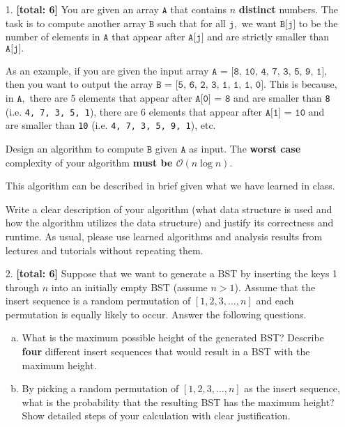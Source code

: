 \documentclass{assignment-263}
\newcommand{\bigOh}{\mathcal{O}}
\begin{document}
\think

  \begin{enumerate}

%  
\item[1.] \textbf{[total: 6]}
  You are given an array $\texttt{A}$ that contains $n$ \textbf{distinct}
  numbers. The task is to compute another array $\texttt{B}$ such that for all
  $\texttt{j},$ we want $\texttt{B[j]}$ to be the number of elements in
  $\texttt{A}$ that appear after $\texttt{A[j]}$ and are strictly
  smaller than $\texttt{A[j]}.$

  As an example, if you are given the input array
  $\texttt{A = [8, 10, 4, 7, 3, 5, 9, 1]},$ then you want to output
  the array $\texttt{B = [5, 6, 2, 3, 1, 1, 1, 0]}.$ This is because,
  in $\texttt{A},$ there are 5 elements that appear after
  $\texttt{A[0] = 8}$ and are smaller than \texttt{8} (i.e. \texttt{4,
    7, 3, 5, 1}), there are 6 elements that appear after
  $\texttt{A[1] = 10}$ and are smaller than \texttt{10}
  (i.e. \texttt{4, 7, 3, 5, 9, 1}), etc.
  

  Design an algorithm to compute $\texttt{B}$ given $\texttt{A}$ as
  input. The \textbf{worst case} complexity of your algorithm
  \textbf{must be $\bigOh(n\log n)$}.

  This algorithm can be described in brief given what we have learned
  in class. 
  
  Write a clear description of your algorithm (what data structure is
  used and how the algorithm utilizes the data structure) and justify
  its correctness and runtime. As usual, please use learned algorithms
  and analysis results from lectures and tutorials without repeating
  them.

  \item[2.] \textbf{[total: 6]} Suppose that we want to generate a BST by
  inserting the keys 1 through $n$ into an initially empty BST (assume
  $n > 1$). Assume that the insert sequence is a random permutation of
  $[1,2,3,\dots, n]$ and each permutation is equally likely to
  occur. Answer the following questions.
  \begin{enumerate}[(a)]

  \item What is the maximum possible height of the generated BST?
    Describe \textbf{four} different insert sequences that would
    result in a BST with the maximum height.

  \item By picking a random permutation of $[1,2,3,\dots, n]$ as the
    insert sequence, what is the probability that the resulting BST
    has the maximum height? Show detailed steps of your calculation
    with clear justification.
  \end{enumerate}
  

\end{enumerate}
\end{document}
